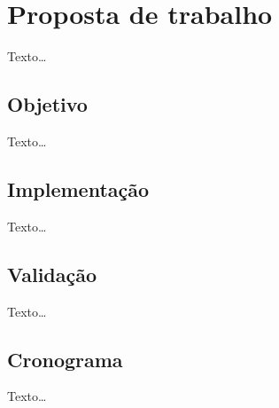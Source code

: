 
\section{Proposta de trabalho}
\label{sec:section5}
Texto\ldots

\subsection{Objetivo}
Texto\ldots

\subsection{Implementação}
Texto\ldots

\subsection{Validação}
Texto\ldots

\subsection{Cronograma}
Texto\ldots
